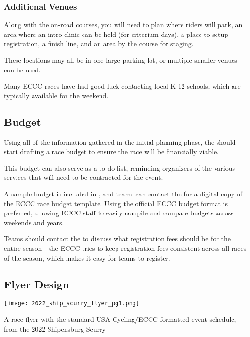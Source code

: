 \subsubsection{Additional Venues}

Along with the on-road courses, you will need to plan where riders will park,
an area where an intro-clinic can be held (for criterium days),
a place to setup registration,
a finish line,
and an area by the course for staging.

These locations may all be in one large parking lot, or multiple smaller venues can be used.

Many ECCC races have had good luck contacting local K-12 schools, which are typically available for the weekend.

\subsection{Budget}

Using all of the information gathered in the initial planning phase, the  should start drafting a race budget
to ensure the race will be financially viable.

This budget can also serve as a to-do list, reminding organizers of the various services that will need to be contracted for the event.

A sample budget is included in , and teams can contact the 
for a digital copy of the ECCC race budget template.
Using the official ECCC budget format is preferred, allowing ECCC staff to easily compile and compare budgets across weekends and years.

Teams should contact the  to discuss what registration fees should be for the entire season -
the ECCC tries to keep registration fees consistent across all races of the season, which makes it easy for teams to register.

\subsection{Flyer Design}

\begin{marginfigure}
  \texttt{[image: 2022\_ship\_scurry\_flyer\_pg1.png]}
  \caption[An example race flyer]{A race flyer with the standard USA Cycling/ECCC formatted event schedule, from the 2022 Shipensburg Scurry}
\end{marginfigure}

